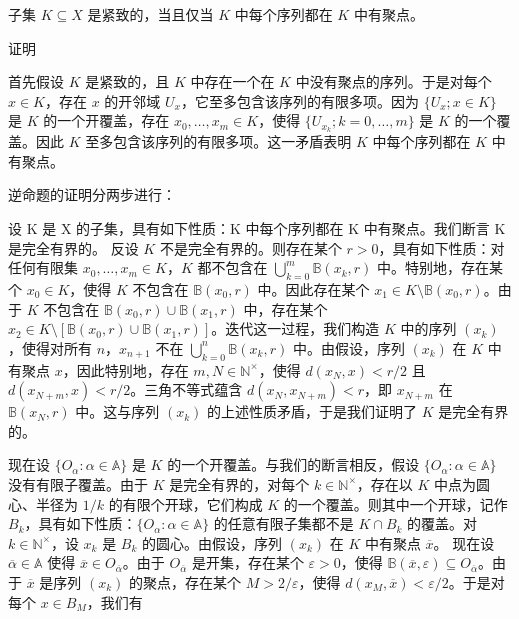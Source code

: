 \begin{theorem}

子集 $K \subseteq X$ 是紧致的，当且仅当 $K$ 中每个序列都在 $K$ 中有聚点。

证明

\begin{subitems}
\item

首先假设 $K$ 是紧致的，且 $K$ 中存在一个在 $K$ 中没有聚点的序列。于是对每个 $x \in K$，存在 $x$ 的开邻域 $U_x$，它至多包含该序列的有限多项。因为 $\{U_x; x \in K\}$ 是 $K$ 的一个开覆盖，存在 $x_0, \ldots, x_m \in K$，使得 $\{U_{x_k}; k = 0, \ldots, m\}$ 是 $K$ 的一个覆盖。因此 $K$ 至多包含该序列的有限多项。这一矛盾表明 $K$ 中每个序列都在 $K$ 中有聚点。

\item

逆命题的证明分两步进行：

\end{subitems}

\begin{items}
\item

设 K 是 X 的子集，具有如下性质：K 中每个序列都在 K 中有聚点。我们断言 K 是完全有界的。
反设 $K$ 不是完全有界的。则存在某个 $r > 0$，具有如下性质：对任何有限集 $x_0, \ldots, x_m \in K$，$K$ 都不包含在 $\bigcup_{k=0}^{m}\mathbb{B}(x_k, r)$ 中。特别地，存在某个 $x_0 \in K$，使得 $K$ 不包含在 $\mathbb{B}(x_0, r)$ 中。因此存在某个 $x_1 \in K \setminus \mathbb{B}(x_0, r)$。由于 $K$ 不包含在 $\mathbb{B}(x_0, r) \cup \mathbb{B}(x_1, r)$ 中，存在某个 $x_2 \in K \setminus \left[\mathbb{B}(x_0, r) \cup \mathbb{B}(x_1, r)\right]$。迭代这一过程，我们构造 $K$ 中的序列 $(x_k)$，使得对所有 $n$，$x_{n+1}$ 不在 $\bigcup_{k=0}^{n}\mathbb{B}(x_k, r)$ 中。由假设，序列 $(x_k)$ 在 $K$ 中有聚点 $x$，因此特别地，存在 $m, N \in \mathbb{N}^\times$，使得 $d(x_N, x) < r/2$ 且 $d(x_{N+m}, x) < r/2$。三角不等式蕴含 $d(x_N, x_{N+m}) < r$，即 $x_{N+m}$ 在 $\mathbb{B}(x_N, r)$ 中。这与序列 $(x_k)$ 的上述性质矛盾，于是我们证明了 $K$ 是完全有界的。

\item

现在设 $\{O_\alpha : \alpha \in \mathbb{A}\}$ 是 $K$ 的一个开覆盖。与我们的断言相反，假设 $\{O_\alpha : \alpha \in \mathbb{A}\}$ 没有有限子覆盖。由于 $K$ 是完全有界的，对每个 $k \in \mathbb{N}^\times$，存在以 $K$ 中点为圆心、半径为 $1/k$ 的有限个开球，它们构成 $K$ 的一个覆盖。则其中一个开球，记作 $B_k$，具有如下性质：$\{O_\alpha : \alpha \in \mathbb{A}\}$ 的任意有限子集都不是 $K \cap B_k$ 的覆盖。对 $k \in \mathbb{N}^\times$，设 $x_k$ 是 $B_k$ 的圆心。由假设，序列 $(x_k)$ 在 $K$ 中有聚点 $\overline{x}$。
现在设 $ \overline{\alpha} \in \mathbb{A} $ 使得 $ \overline{x} \in O_{\overline{\alpha}} $。由于 $ O_{\overline{\alpha}} $ 是开集，存在某个 $ \varepsilon > 0 $，使得 $ \mathbb{B}(\overline{x}, \varepsilon) \subseteq O_{\overline{\alpha}} $。由于 $ \overline{x} $ 是序列 $ (x_k) $ 的聚点，存在某个 $ M > 2/\varepsilon $，使得 $ d(x_M, \overline{x}) < \varepsilon/2 $。于是对每个 $ x \in B_M $，我们有


\end{items}
\end{theorem}
